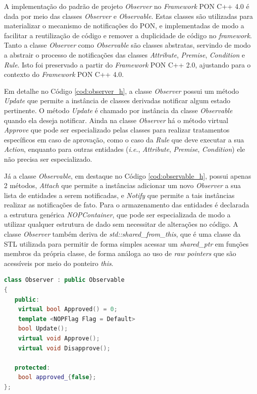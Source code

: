 A implementação do padrão de projeto \textit{Observer} no \textit{Framework} PON
C++ 4.0 é dada por meio das classes \textit{Observer} e \textit{Observable}.
Estas classes são utilizadas para materializar o mecanismo de notificações do
PON, e implementadas de modo a facilitar a reutilização de código e remover a
duplicidade de código no \textit{framework}. Tanto a classe \textit{Observer}
como \textit{Observable} são classes abstratas, servindo de modo a abstrair o
processo de notificações das classes \textit{Attribute}, \textit{Premise},
\textit{Condition} e \textit{Rule}. Isto foi preservado a partir do
\textit{Framework} PON C++ 2.0, ajustando para o contexto do \textit{Framework}
PON C++ 4.0.

Em detalhe no Código \ref{cod:observer_h}, a classe \textit{Observer} possui um
método \textit{Update} que permite a instância de classes derivadas notificar
algum estado pertinente. O método \textit{Update} é chamado por instância da
classe \textit{Observable} quando ela deseja notificar. Ainda na classe
\textit{Observer} há o método virtual \textit{Approve} que pode ser
especializado pelas classes para realizar tratamentos específicos em caso de
aprovação, como o caso da \textit{Rule} que deve executar a sua \textit{Action},
enquanto para outras entidades (\textit{i.e.}, \textit{Attribute},
\textit{Premise}, \textit{Condition}) ele não precisa ser especializado. 

Já a classe \textit{Observable}, em destaque no Código \ref{cod:observable_h},
possui apenas 2 métodos, \textit{Attach} que permite a instâncias adicionar um
novo \textit{Observer} a sua lista de entidades a serem notificadas, e
\textit{Notify} que permite a tais instâncias realizar as notificações de fato.
Para o armazenamento das entidades é declarada a estrutura genérica
\textit{NOPContainer}, que pode ser especializada de modo a utilizar qualquer
estrutura de dado sem necessitar de alterações no código. A classe
\textit{Observer} também deriva de \textit{std::shared\_from\_this}, que é uma
classe da STL utilizada para permitir de forma simples acessar um
\textit{shared\_ptr} em funções membros da própria classe, de forma análoga ao
uso de \textit{raw pointers} que são acessíveis por meio do ponteiro
\textit{this}.

\begin{lstlisting}[language=C++, float=htb,
caption = {Implementação da classe \textit{Observer} no \textit{Framework} PON C++ 4.0},
source = {Autoria própria},
label = {cod:observer_h}]
class Observer : public Observable
{
   public:
    virtual bool Approved() = 0;
    template <NOPFlag Flag = Default>
    bool Update();
    virtual void Approve();
    virtual void Disapprove();

   protected:
    bool approved_{false};
};
\end{lstlisting}


